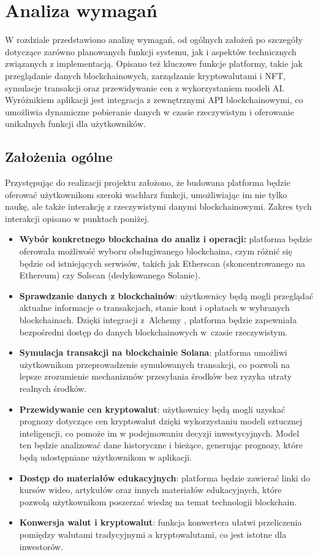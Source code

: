 \chapter{Analiza wymagań}
W rozdziale przedstawiono analizę wymagań, od ogólnych założeń po szczegóły dotyczące zarówno planowanych funkcji systemu, jak i aspektów technicznych związanych z implementacją. Opisano też kluczowe funkcje platformy, takie jak przeglądanie danych blockchainowych, zarządzanie kryptowalutami i NFT, symulacje transakcji oraz przewidywanie cen z wykorzystaniem modeli AI. Wyróżnikiem aplikacji jest integracja z zewnętrznymi API blockchainowymi, co umożliwia dynamiczne pobieranie danych w czasie rzeczywistym i oferowanie unikalnych funkcji dla użytkowników.

\section{Założenia ogólne}
Przystępując do realizacji projektu założono, że budowana platforma będzie oferować użytkownikom szeroki wachlarz funkcji, umożliwiając im nie tylko naukę, ale także interakcję z rzeczywistymi danymi blockchainowymi. Zakres tych interakcji opisano w punktach poniżej.
\begin{itemize}
\item \textbf{Wybór konkretnego blockchaina do analiz i operacji:} platforma będzie oferowała możliwość wyboru obsługiwanego blockchaina, czym różnić się będzie od istniejących serwisów, takich jak Etherscan (skoncentrowanego na Ethereum) czy Solscan (dedykowanego Solanie).
\item \textbf{Sprawdzanie danych z blockchainów}: użytkownicy będą mogli przeglądać aktualne informacje o transakcjach, stanie kont i opłatach w wybranych blockchainach. Dzięki integracji z~Alchemy \cite{alchemy_api}, platforma będzie zapewniała bezpośredni dostęp do danych blockchainowych w~czasie rzeczywistym. 
\item \textbf{Symulacja transakcji na blockchainie Solana}: platforma umożliwi użytkownikom przeprowadzenie symulowanych transakcji, co pozwoli na lepsze zrozumienie mechanizmów przesyłania środków bez ryzyka utraty realnych środków. 
\item \textbf{Przewidywanie cen kryptowalut}: użytkownicy będą mogli uzyskać prognozy dotyczące cen kryptowalut dzięki wykorzystaniu modeli sztucznej inteligencji, co pomoże im w podejmowaniu decyzji inwestycyjnych. Model ten będzie analizować dane historyczne i bieżące, generując prognozy, które będą udostępniane użytkownikom w aplikacji.
\item \textbf{Dostęp do materiałów edukacyjnych}: platforma będzie zawierać linki do kursów wideo, artykułów oraz innych materiałów edukacyjnych, które pozwolą użytkownikom poszerzać wiedzę na temat technologii blockchain. 
\item \textbf{Konwersja walut i kryptowalut}: funkcja konwertera ułatwi przeliczenia pomiędzy walutami tradycyjnymi a kryptowalutami, co jest istotne dla inwestorów. 
\end{itemize}
